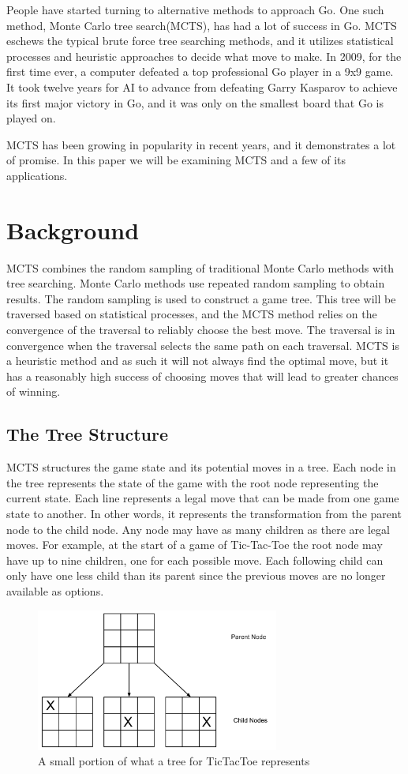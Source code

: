 \documentclass{sig-alternate}
\begin{document}
People have started turning to alternative methods to approach Go. One such method, Monte Carlo tree search(MCTS), has had a lot of success in Go. MCTS eschews the typical brute force tree searching methods, and it utilizes statistical processes and heuristic approaches to decide what move to make. In 2009, for the first time ever, a computer defeated a top professional Go player in a 9x9 game\cite{TheGrandChallenge}. It took twelve years for AI to advance from defeating Garry Kasparov to achieve its first major victory in Go, and it was only on the smallest board that Go is played on.

MCTS has been growing in popularity in recent years, and it demonstrates a lot of promise. In this paper we will be examining MCTS and a few of its applications.  
\section{Background}
MCTS combines the random sampling of traditional Monte Carlo methods with tree searching. Monte Carlo methods use repeated random sampling to obtain results. The random sampling is used to construct a game tree. This tree will be traversed based on statistical processes, and the MCTS method relies on the convergence of the traversal to reliably choose the best move. The traversal is in convergence when the traversal selects the same path on each traversal. MCTS is a heuristic method and as such it will not always find the optimal move, but it has a reasonably high success of choosing moves that will lead to greater chances of winning.
\subsection{The Tree Structure}\label{sec:TreeStructure}
MCTS structures the game state and its potential moves in a tree. Each node in the tree represents the state of the game with the root node representing the current state. Each line represents a legal move that can be made from one game state to another. In other words, it represents the transformation from the parent node to the child node. Any node may have as many children as there are legal moves. For example, at the start of a game of Tic-Tac-Toe the root node may have up to nine children, one for each possible move. Each following child can only have one less child than its parent since the previous moves are no longer available as options.

\begin{figure}[h]
\includegraphics[width=8cm]{TicTacToeTree.pdf}
\centering
\caption{A small portion of what a tree for TicTacToe represents}
\label{fig:TicTacToe}
\end{figure}
\end{document}
